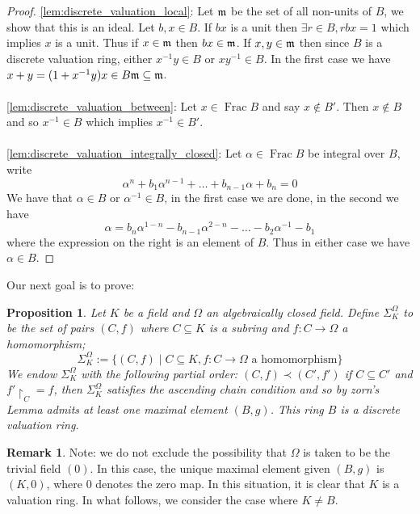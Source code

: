 \documentclass[12pt]{article}
\theoremstyle{plain}
\newtheorem{proposition}[thm]{Proposition}
\theoremstyle{definition}
\newtheorem{remark}[thm]{Remark}
\newcommand{\lto}{\longrightarrow}
\begin{document}
	\begin{proof}
		\ref{lem:discrete_valuation_local}: Let $\frak{m}$ be the set of all non-units of $B$, we show that this is an ideal. Let $b,x  \in B$. If $bx$ is a unit then $\exists r \in B, rbx = 1$ which implies $x$ is a unit. Thus if $x \in \frak{m}$ then $bx \in \frak{m}$. If $x,y \in \frak{m}$ then since $B$ is a discrete valuation ring, either $x^{-1}y \in B$ or $xy^{-1} \in B$. In the first case we have $x + y = (1 + x^{-1}y)x \in B\frak{m} \subseteq \frak{m}$.\\\\
		\ref{lem:discrete_valuation_between}: Let $x \in \operatorname{Frac}B$ and say $x \not\in B'$. Then $x \not\in B$ and so $x^{-1} \in B$ which implies $x^{-1} \in B'$.\\\\
		\ref{lem:discrete_valuation_integrally_closed}: Let $\alpha \in \operatorname{Frac}B$ be integral over $B$, write
		\[\alpha^n + b_1\alpha^{n-1} + \hdots + b_{n-1}\alpha + b_n = 0\]
		We have that $\alpha \in B$ or $\alpha^{-1} \in B$, in the first case we are done, in the second we have
		\[\alpha = b_n \alpha^{1-n}  - b_{n-1}\alpha^{2-n} - \hdots - b_2\alpha^{-1} - b_1\]
		where the expression on the right is an element of $B$. Thus in either case we have $\alpha \in B$.
	\end{proof}
	Our next goal is to prove:
	\begin{proposition}
		\label{prop:maximal_elt_DVR}
		Let $K$ be a field and $\Omega$ an algebraically closed field. Define $\Sigma_K^\Omega$ to be the set of pairs $(C,f)$ where $C \subseteq K$ is a subring and $f: C \lto \Omega$ a homomorphism;
		\[\Sigma_K^\Omega := \lbrace (C,f)\mid C \subseteq K, f: C \lto \Omega\text{ a homomorphism}\rbrace\]
		We endow $\Sigma_K^\Omega$ with the following partial order: $(C,f) \prec (C',f')$ if $C \subseteq C'$ and $f'\restriction_{C} = f$, then $\Sigma_K^\Omega$ satisfies the ascending chain condition and so by zorn's Lemma admits at least one maximal element $(B,g)$. This ring $B$ is a discrete valuation ring.
	\end{proposition}
	\begin{remark}
		Note: we do not exclude the possibility that $\Omega$ is taken to be the trivial field $(0)$. In this case, the unique maximal element given $(B,g)$ is $(K,0)$, where $0$ denotes the zero map. In this situation, it is clear that $K$ is a valuation ring. In what follows, we consider the case where $K \neq B$.
	\end{remark}
\end{document}
